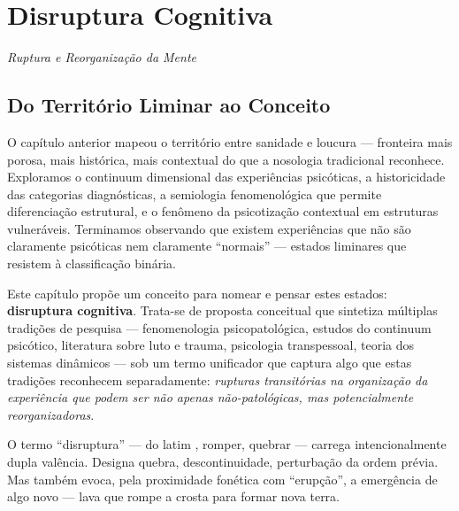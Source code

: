 \chapter{Disruptura Cognitiva}
\label{ch:disruptura}

\begin{flushright}
\textit{Ruptura e Reorganização da Mente}
\end{flushright}

\vspace{1em}

\section{Do Território Liminar ao Conceito}
\label{sec:territorio-liminar}

O capítulo anterior mapeou o território entre sanidade e loucura --- fronteira mais porosa, mais histórica, mais contextual do que a nosologia tradicional reconhece. Exploramos o continuum dimensional das experiências psicóticas, a historicidade das categorias diagnósticas, a semiologia fenomenológica que permite diferenciação estrutural, e o fenômeno da psicotização contextual em estruturas vulneráveis. Terminamos observando que existem experiências que não são claramente psicóticas nem claramente \enquote{normais} --- estados liminares que resistem à classificação binária.

Este capítulo propõe um conceito para nomear e pensar estes estados: \textbf{disruptura cognitiva}. Trata-se de proposta conceitual que sintetiza múltiplas tradições de pesquisa --- fenomenologia psicopatológica, estudos do continuum psicótico, literatura sobre luto e trauma, psicologia transpessoal, teoria dos sistemas dinâmicos --- sob um termo unificador que captura algo que estas tradições reconhecem separadamente: \textit{rupturas transitórias na organização da experiência que podem ser não apenas não-patológicas, mas potencialmente reorganizadoras}.

O termo \enquote{disruptura} --- do latim , romper, quebrar --- carrega intencionalmente dupla valência. Designa quebra, descontinuidade, perturbação da ordem prévia. Mas também evoca, pela proximidade fonética com \enquote{erupção}, a emergência de algo novo --- lava que rompe a crosta para formar nova terra.

